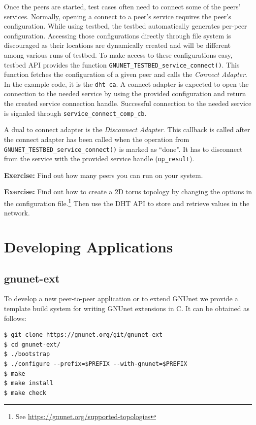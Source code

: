 \documentclass[10pt]{article}
\newcommand{\exercise}[1]{\noindent\begin{boxedminipage}{\textwidth}{\bf Exercise:} #1 \end{boxedminipage}}
\begin{document}
Once the peers are started, test cases often need to connect some of the peers'
services.  Normally, opening a connect to a peer's service requires the peer's
configuration.  While using testbed, the testbed automatically generates
per-peer configuration.  Accessing those configurations directly through file
system is discouraged as their locations are dynamically created and will be
different among various runs of testbed.  To make access to these configurations
easy, testbed API provides the function
\texttt{GNUNET\_TESTBED\_service\_connect()}.  This function fetches the
configuration of a given peer and calls the \textit{Connect Adapter}.
In the example code, it is the \texttt{dht\_ca}.  A connect adapter is expected
to open the connection to the needed service by using the provided configuration
and return the created service connection handle.  Successful connection to the
needed service is signaled through \texttt{service\_connect\_comp\_cb}.

A dual to connect adapter is the \textit{Disconnect Adapter}.  This callback is
called after the connect adapter has been called when the operation from
\texttt{GNUNET\_TESTBED\_service\_connect()} is marked as ``done''.  It has to
disconnect from the service with the provided service handle (\texttt{op\_result}).

\exercise{Find out how many peers you can run on your system.}

\exercise{Find out how to create a 2D torus topology by changing the
  options in the configuration file.\footnote{See \url{https://gnunet.org/supported-topologies}}
  Then use the DHT API to store and retrieve values in the
  network.}


\section{Developing Applications}

\subsection{gnunet-ext}
To develop a new peer-to-peer application or to extend GNUnet we provide
a template build system for writing GNUnet extensions in C. It can be
obtained as follows:

\lstset{language=bash}
\begin{lstlisting}
$ git clone https://gnunet.org/git/gnunet-ext
$ cd gnunet-ext/
$ ./bootstrap
$ ./configure --prefix=$PREFIX --with-gnunet=$PREFIX
$ make
$ make install
$ make check
\end{lstlisting}
\end{document}
